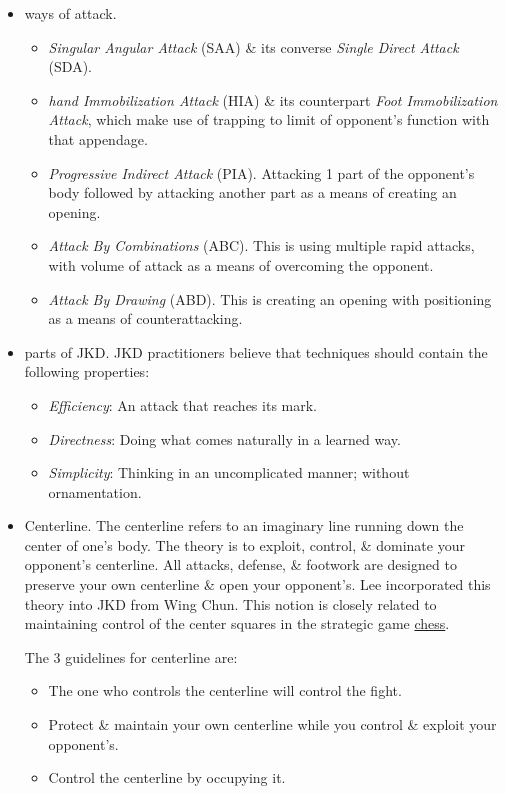 \documentclass{article}
\begin{document}
\begin{itemize}
	\item { ways of attack.}
	\begin{itemize}
		\item {\it Singular Angular Attack} (SAA) \& its converse {\it Single Direct Attack} (SDA).
		\item {\it hand Immobilization Attack} (HIA) \& its counterpart {\it Foot Immobilization Attack}, which make use of trapping to limit of opponent's function with that appendage.
		\item {\it Progressive Indirect Attack} (PIA). Attacking 1 part of the opponent's body followed by attacking another part as a means of creating an opening.
		\item {\it Attack By Combinations} (ABC). This is using multiple rapid attacks, with volume of attack as a means of overcoming the opponent.
		\item {\it Attack By Drawing} (ABD). This is creating an opening with positioning as a means of counterattacking.
	\end{itemize}
	\item { parts of JKD.} JKD practitioners believe that techniques should contain the following properties:
	\begin{itemize}
		\item {\it Efficiency}: An attack that reaches its mark.
		\item {\it Directness}: Doing what comes naturally in a learned way.
		\item {\it Simplicity}: Thinking in an uncomplicated manner; without ornamentation.
	\end{itemize}
	\item {\sf Centerline.} The centerline refers to an imaginary line running down the center of one's body. The theory is to exploit, control, \& dominate your opponent's centerline. All attacks, defense, \& footwork are designed to preserve your own centerline \& open your opponent's. {\sc Lee} incorporated this theory into JKD from Wing Chun. This notion is closely related to maintaining control of the center squares in the strategic game \href{https://en.wikipedia.org/wiki/Chess}{chess}.

	The 3 guidelines for centerline are:
	\begin{itemize}
		\item The one who controls the centerline will control the fight.
		\item Protect \& maintain your own centerline while you control \& exploit your opponent's.
		\item Control the centerline by occupying it.
	\end{itemize}
\end{itemize}
\end{document}
